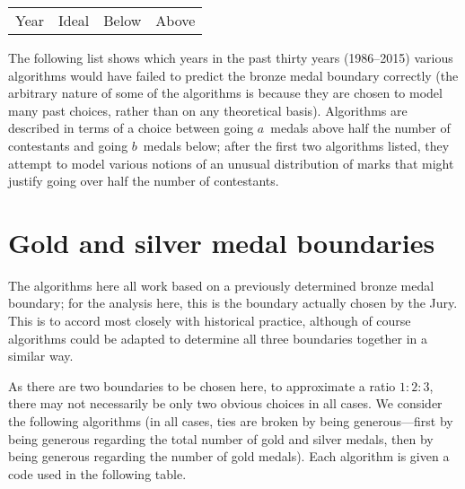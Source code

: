 \documentclass[a4paper,11pt]{article}
\begin{document}
\begin{tabular}{cccc}
Year & Ideal & Below & Above \\

\end{tabular}

The following list shows which years in the past thirty years
(1986--2015) various algorithms would have failed to predict the
bronze medal boundary correctly (the arbitrary nature of some of the
algorithms is because they are chosen to model many past choices,
rather than on any theoretical basis).  Algorithms are described in
terms of a choice between going $a$~medals above half the number of
contestants and going $b$~medals below; after the first two algorithms
listed, they attempt to model various notions of an unusual
distribution of marks that might justify going over half the number of
contestants.

\begin{itemize}

\end{itemize}

\section*{Gold and silver medal boundaries}

The algorithms here all work based on a previously determined bronze
medal boundary; for the analysis here, this is the boundary actually
chosen by the Jury.  This is to accord most closely with historical
practice, although of course algorithms could be adapted to determine
all three boundaries together in a similar way.

As there are two boundaries to be chosen here, to approximate a ratio
$1:2:3$, there may not necessarily be only two obvious choices in all
cases.  We consider the following algorithms (in all cases, ties are
broken by being generous---first by being generous regarding the total
number of gold and silver medals, then by being generous regarding the
number of gold medals).  Each algorithm is given a code used in the
following table.
\end{document}
